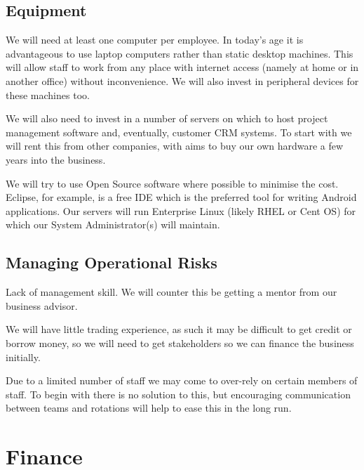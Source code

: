 \documentclass[DIV=calc, paper=a4, fontsize=11pt]{scrartcl}	 %
\begin{document}
\subsection{Equipment}
We will need at least one computer per employee. In today's age it is advantageous to use laptop
computers rather than static desktop machines. This will allow staff to work from any place with
internet access (namely at home or in another office) without inconvenience. We will also invest
in peripheral devices for these machines too.

We will also need to invest in a number of servers on which to host project management software
and, eventually, customer CRM systems. To start with we will rent this from other companies, with
aims to buy our own hardware a few years into the business.

We will try to use Open Source software where possible to minimise the cost. Eclipse, for example,
is a free IDE which is the preferred tool for writing Android applications. Our servers will run
Enterprise Linux (likely RHEL or Cent OS) for which our System Administrator(s) will maintain. 

\subsection{Managing Operational Risks}
Lack of management skill. We will counter this be getting a mentor from our business advisor.

We will have little trading experience, as such it may be difficult to get credit or borrow money,
so we will need to get stakeholders so we can finance the business initially.

Due to a limited number of staff we may come to over-rely on certain members of staff. To begin
with there is no solution to this, but encouraging communication between teams and rotations will
help to ease this in the long run.

\section{Finance}
\end{document}
